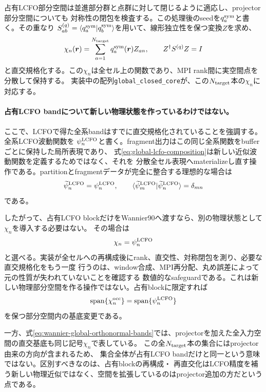 \documentclass[11pt,a4paper]{article}
\newcommand{\code}[1]{\texttt{#1}}
\begin{document}
占有LCFO部分空間は並進部分群と点群に対して閉じるように適応し、projector部分空間についても
対称性の閉包を検査する。この処理後のseedを$q_a^{\rm sym}$と書く。その重なり
$S_{ab}^{(q)}=\langle q_a^{\rm sym}|q_b^{\rm sym}\rangle$を用いて、線形独立性を保つ変換$Z$を求め、
\begin{equation}
 \chi_n(\boldsymbol r)=\sum_{a=1}^{N_{\rm target}}q_a^{\rm sym}(\boldsymbol r)Z_{an},
 \qquad Z^\dagger S^{(q)}Z=I
 \label{eq:wannier-global-orthonormal-bands}
\end{equation}
と直交規格化する。この$\chi_n$は全セル上の関数であり、MPI rank間に実空間点を分散して保持する。
実装中の配列\code{global\_closed\_core}が、この$N_{\rm target}$本の$\chi_n$に対応する。

\paragraph{占有LCFO bandについて新しい物理状態を作っているわけではない。}
ここで、LCFOで得た全系bandはすでに直交規格化されていることを強調する。全系LCFO波動関数を
$\psi_n^{\rm LCFO}$と書く。fragment出力はこの同じ全系関数をbufferごとに保持した局所表現であり、
式\eqref{eq:global-lcfo-composition}は新しい近似波動関数を定義するためではなく、それを
分散全セル表現へmaterializeし直す操作である。partitionとfragmentデータが完全に整合する理想的な場合は
\begin{equation}
 \widetilde\psi_n^{\rm LCFO}=\psi_n^{\rm LCFO},
 \qquad
 \langle\widetilde\psi_m^{\rm LCFO}|\widetilde\psi_n^{\rm LCFO}\rangle=\delta_{mn}
 \label{eq:lcfo-materialization-identity}
\end{equation}
である。

したがって、占有LCFO blockだけをWannier90へ渡すなら、別の物理状態として$\chi_n$を導入する必要はない。
その場合は
\begin{equation}
 \chi_n=\psi_n^{\rm LCFO}
 \label{eq:chi-equals-lcfo-when-complete}
\end{equation}
と選べる。実装が全セルへの再構成後にrank、直交性、対称閉包を測り、必要な直交規格化をもう一度
行うのは、window合成、MPI再分配、丸め誤差によって元の性質が失われていないことを確認する
数値的なsafeguardである。これは新しい物理部分空間を作る操作ではない。占有blockに限定すれば
\begin{equation}
 \operatorname{span}\{\chi_n^{\rm occ}\}=\operatorname{span}\{\psi_n^{\rm LCFO}\}
 \label{eq:occupied-lcfo-span-preserved}
\end{equation}
を保つ部分空間内の基底変更である。

一方、式\eqref{eq:wannier-global-orthonormal-bands}では、projectorを加えた全入力空間の直交基底も同じ記号$\chi_n$で表している。
この全$N_{\rm target}$本の集合にはprojector由来の方向が含まれるため、
集合全体が占有LCFO bandだけと同一という意味ではない。区別すべきなのは、占有blockの再構成・
再直交化はLCFO精度を補う新しい物理近似ではなく、空間を拡張しているのはprojector追加の方だという点である。
\end{document}
